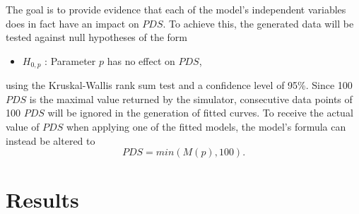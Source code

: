 \documentclass[a4paper,12pt,twoside]{report}
\begin{document}
The goal is to provide evidence that each of the model's independent variables does in fact have an impact on $PDS$. To achieve this, the generated data will be tested against null hypotheses of the form

\begin{itemize}
\item[] $H_{0,p}$ : Parameter $p$ has no effect on $PDS$,
\end{itemize}
using the Kruskal-Wallis rank sum test \cite{kruskal,r} and a confidence level of 95\%. Since 100 $PDS$ is the maximal value returned by the simulator, consecutive data points of 100 $PDS$ will be ignored in the generation of fitted curves. To receive the actual value of $PDS$ when applying one of the fitted models, the model's formula can instead be altered to
\begin{equation}\label{min}
PDS = min(M(p), 100).
\end{equation}
\section{Results} \label{results}
\end{document}
